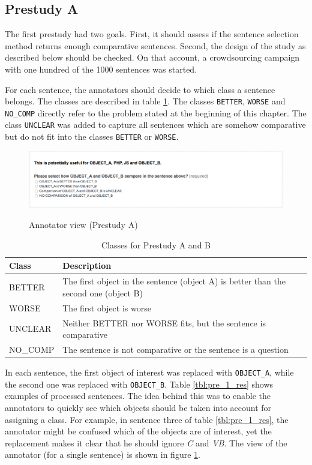 \subsection{Prestudy A}
The first prestudy had two goals. First, it should assess if the sentence selection method returns enough comparative sentences. Second, the design of the study as described below should be checked. On that account, a crowdsourcing campaign with one hundred of the 1000 sentences was started.



For each sentence, the annotators should decide to which class a sentence belongs. The classes are described in table \ref{tbl:prestudyclasses-a}. The classes \texttt{BETTER}, \texttt{WORSE} and \texttt{NO\_COMP} directly refer to the problem stated at the beginning of this chapter. The class \texttt{UNCLEAR} was added to capture all sentences which are somehow comparative but do not fit into the classes \texttt{BETTER} or \texttt{WORSE}.

\begin{figure}[h]
\centering
\includegraphics[width=1\textwidth]{images/prestudy/1_question}
\label{img:1_question}
\caption{Annotator view (Prestudy A)}
\end{figure}

\begin{table}[h]
\centering
\caption{Classes for Prestudy A and B}
\label{tbl:prestudyclasses-a}
\begin{tabular}{@{}ll@{}}
\toprule
Class & Description \\ \midrule
BETTER & The first object in the sentence (object A) is better than the second one (object B)\\
WORSE & The first object is worse \\
UNCLEAR & Neither BETTER nor WORSE fits, but the sentence is comparative\\
NO\_COMP & The sentence is not comparative or the sentence is a question\\
\bottomrule
\end{tabular}
\end{table}

In each sentence, the first object of interest was replaced with \texttt{OBJECT\_A}, while the second one was replaced with \texttt{OBJECT\_B}. Table \ref{tbl:pre_1_res} shows examples of processed sentences. The idea behind this was to enable the annotators to quickly see which objects should be taken into account for assigning a class. For example, in sentence three of table \ref{tbl:pre_1_res}, the annotator might be confused which of the objects are of interest, yet the replacement makes it clear that he should ignore \emph{C} and \emph{VB}. The view of the annotator (for a single sentence) is shown in figure \ref{img:1_question}.

